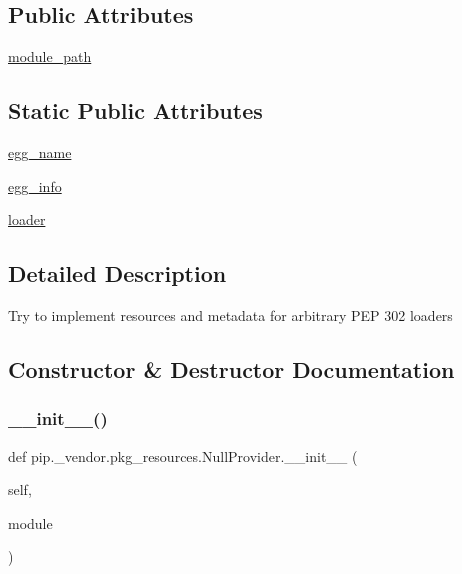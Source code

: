 \subsection*{Public Attributes}
\begin{DoxyCompactItemize}
\item 
\hyperlink{classpip_1_1__vendor_1_1pkg__resources_1_1NullProvider_a0c25a5491b9c717b671034a693540371}{module\+\_\+path}
\end{DoxyCompactItemize}
\subsection*{Static Public Attributes}
\begin{DoxyCompactItemize}
\item 
\hyperlink{classpip_1_1__vendor_1_1pkg__resources_1_1NullProvider_a0045873369298e715b63c0d7716fbac5}{egg\+\_\+name}
\item 
\hyperlink{classpip_1_1__vendor_1_1pkg__resources_1_1NullProvider_a6271ea37ba51569b82f66629e11772e0}{egg\+\_\+info}
\item 
\hyperlink{classpip_1_1__vendor_1_1pkg__resources_1_1NullProvider_ae8acfed4e059560ba2bdec8e5194c294}{loader}
\end{DoxyCompactItemize}


\subsection{Detailed Description}
\begin{DoxyVerb}Try to implement resources and metadata for arbitrary PEP 302 loaders\end{DoxyVerb}
 

\subsection{Constructor \& Destructor Documentation}
\mbox{\label{classpip_1_1__vendor_1_1pkg__resources_1_1NullProvider_aa00f0e3c6a00cfc7c7ad0f31cdeb492d}} 
\subsubsection{\texorpdfstring{\+\_\+\+\_\+init\+\_\+\+\_\+()}{\_\_init\_\_()}}
{\footnotesize\ttfamily def pip.\+\_\+vendor.\+pkg\+\_\+resources.\+Null\+Provider.\+\_\+\+\_\+init\+\_\+\+\_\+ (\begin{DoxyParamCaption}\item[{}]{self,  }\item[{}]{module }\end{DoxyParamCaption})}



